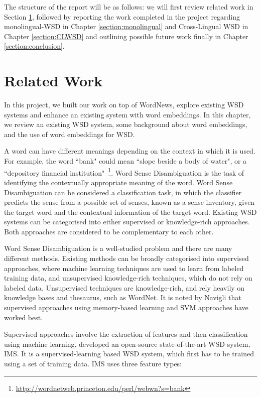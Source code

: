 \documentclass[11pt]{article}
\begin{document}
The structure of the report will be as follows: we will first review related work in Section \ref{ch:related}, followed by reporting the work completed in the project regarding monolingual-WSD in Chapter \ref{section:monolingual} and Cross-Lingual WSD in Chapter \ref{section:CLWSD} and outlining possible future work finally in Chapter \ref{section:conclusion}. 

\section{Related Work}
\label{ch:related}

In this project, we built our work on top of WordNews, explore existing WSD systems and enhance an existing system with word embeddings. In this chapter, we review an existing WSD system, some background about word embeddings, and the use of word embeddings for WSD. 


A word can have different meanings depending on the context in which it is used. For example, the word ``bank" could mean ``slope beside a body of water", or a ``depository financial institution"~\footnote{\url{http://wordnetweb.princeton.edu/perl/webwn?s=bank}}. Word Sense Disambiguation is the task of identifying the contextually appropriate meaning of the word. Word Sense Disambiguation can be considered a classification task, in which the classifier predicts the sense from a possible set of senses, known as a sense inventory, given the target word and the contextual information of the target word. Existing WSD systems can be categorised into either supervised or knowledge-rich approaches. Both approaches are considered to be complementary to each other. 


Word Sense Disambiguation is a well-studied problem and there are many different methods. Existing methods can be broadly categorised into supervised approaches, where machine learning techniques are used to learn from labeled training data, and unsupervised knowledge-rich techniques, which do not rely on labeled data. Unsupervised techniques are knowledge-rich, and rely heavily on knowledge bases and thesaurus, such as WordNet. It is noted by Navigli  that supervised approaches using memory-based learning and SVM approaches have worked best. 

Supervised approaches involve the extraction of features and then classification using machine learning.  developed an open-source state-of-the-art WSD system, IMS. It is a supervised-learning based WSD system, which first has to be trained using a set of training data. IMS uses three feature types:
\end{document}
